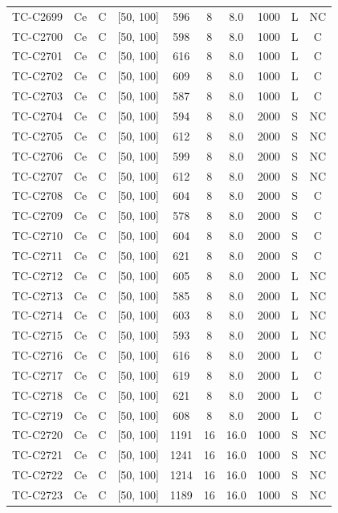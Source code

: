 \begin{longtable}{lccccccccc}
TC-C2699 & Ce & C & [50, 100] & 596 & 8 & 8.0 & 1000 & L & NC \\
TC-C2700 & Ce & C & [50, 100] & 598 & 8 & 8.0 & 1000 & L & C \\
TC-C2701 & Ce & C & [50, 100] & 616 & 8 & 8.0 & 1000 & L & C \\
TC-C2702 & Ce & C & [50, 100] & 609 & 8 & 8.0 & 1000 & L & C \\
TC-C2703 & Ce & C & [50, 100] & 587 & 8 & 8.0 & 1000 & L & C \\
TC-C2704 & Ce & C & [50, 100] & 594 & 8 & 8.0 & 2000 & S & NC \\
TC-C2705 & Ce & C & [50, 100] & 612 & 8 & 8.0 & 2000 & S & NC \\
TC-C2706 & Ce & C & [50, 100] & 599 & 8 & 8.0 & 2000 & S & NC \\
TC-C2707 & Ce & C & [50, 100] & 612 & 8 & 8.0 & 2000 & S & NC \\
TC-C2708 & Ce & C & [50, 100] & 604 & 8 & 8.0 & 2000 & S & C \\
TC-C2709 & Ce & C & [50, 100] & 578 & 8 & 8.0 & 2000 & S & C \\
TC-C2710 & Ce & C & [50, 100] & 604 & 8 & 8.0 & 2000 & S & C \\
TC-C2711 & Ce & C & [50, 100] & 621 & 8 & 8.0 & 2000 & S & C \\
TC-C2712 & Ce & C & [50, 100] & 605 & 8 & 8.0 & 2000 & L & NC \\
TC-C2713 & Ce & C & [50, 100] & 585 & 8 & 8.0 & 2000 & L & NC \\
TC-C2714 & Ce & C & [50, 100] & 603 & 8 & 8.0 & 2000 & L & NC \\
TC-C2715 & Ce & C & [50, 100] & 593 & 8 & 8.0 & 2000 & L & NC \\
TC-C2716 & Ce & C & [50, 100] & 616 & 8 & 8.0 & 2000 & L & C \\
TC-C2717 & Ce & C & [50, 100] & 619 & 8 & 8.0 & 2000 & L & C \\
TC-C2718 & Ce & C & [50, 100] & 621 & 8 & 8.0 & 2000 & L & C \\
TC-C2719 & Ce & C & [50, 100] & 608 & 8 & 8.0 & 2000 & L & C \\
TC-C2720 & Ce & C & [50, 100] & 1191 & 16 & 16.0 & 1000 & S & NC \\
TC-C2721 & Ce & C & [50, 100] & 1241 & 16 & 16.0 & 1000 & S & NC \\
TC-C2722 & Ce & C & [50, 100] & 1214 & 16 & 16.0 & 1000 & S & NC \\
TC-C2723 & Ce & C & [50, 100] & 1189 & 16 & 16.0 & 1000 & S & NC \\

\end{longtable}
